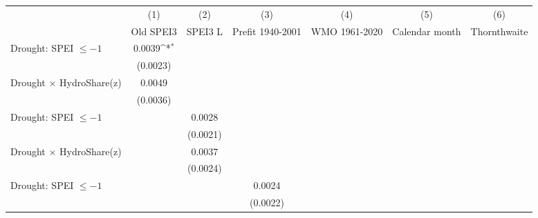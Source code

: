 {
\def\sym#1{\ifmmode^{#1}\else\(^{#1}\)\fi}
\begin{tabular}{l*{6}{c}}
\toprule
                    &\multicolumn{1}{c}{(1)}&\multicolumn{1}{c}{(2)}&\multicolumn{1}{c}{(3)}&\multicolumn{1}{c}{(4)}&\multicolumn{1}{c}{(5)}&\multicolumn{1}{c}{(6)}\\
                    &\multicolumn{1}{c}{Old SPEI3}&\multicolumn{1}{c}{SPEI3 L}&\multicolumn{1}{c}{Prefit 1940-2001}&\multicolumn{1}{c}{WMO 1961-2020}&\multicolumn{1}{c}{Calendar month}&\multicolumn{1}{c}{Thornthwaite}\\
\midrule
Drought: SPEI $\leq -1$&      0.0039\sym{*}  &                     &                     &                     &                     &                     \\
                    &    (0.0023)         &                     &                     &                     &                     &                     \\
\addlinespace
Drought $\times$ HydroShare(z)&      0.0049         &                     &                     &                     &                     &                     \\
                    &    (0.0036)         &                     &                     &                     &                     &                     \\
\addlinespace
Drought: SPEI $\leq -1$&                     &      0.0028         &                     &                     &                     &                     \\
                    &                     &    (0.0021)         &                     &                     &                     &                     \\
\addlinespace
Drought $\times$ HydroShare(z)&                     &      0.0037         &                     &                     &                     &                     \\
                    &                     &    (0.0024)         &                     &                     &                     &                     \\
\addlinespace
Drought: SPEI $\leq -1$&                     &                     &      0.0024         &                     &                     &                     \\
                    &                     &                     &    (0.0022)         &                     &                     &                     \\

\end{tabular}}
